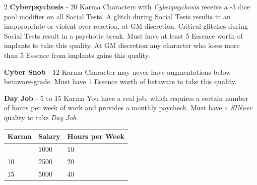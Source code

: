 \documentclass[
  oneside]{article}
\begin{document}
\begin{multicols}{2}
\textbf{Cyberpsychosis} - 20 Karma Characters with
\emph{Cyberpsychosis} receive a -3 dice pool
modifier on all Social Tests. A glitch during
Social Tests results in an inappropriate or
violent over reaction, at GM discretion. Critical
glitches during Social Tests result in a psychotic
break. Must have at least 5 Essence worth of
implants to take this quality. At GM discretion
any character who loses more than 5 Essence from
implants gains this quality.

\textbf{Cyber Snob} - 12 Karma Character may never
have augmentations below betaware-grade. Must have
1 Essence worth of betaware to take this quality.

\textbf{Day Job} - 5 to 15 Karma You have a real
job, which requires a certain number of hours per
week of work and provides a monthly paycheck. Must
have a \emph{SINner} quality to take \emph{Day
Job}.

\end{multicols}

\begin{longtable}[]{@{}lll@{}}
\toprule\noalign{}
Karma & Salary & Hours per Week \\
\midrule\noalign{}
\endhead
\bottomrule\noalign{}
\endlastfoot
5 & 1000 & 10 \\
10 & 2500 & 20 \\
15 & 5000 & 40 \\
\end{longtable}
\end{document}
